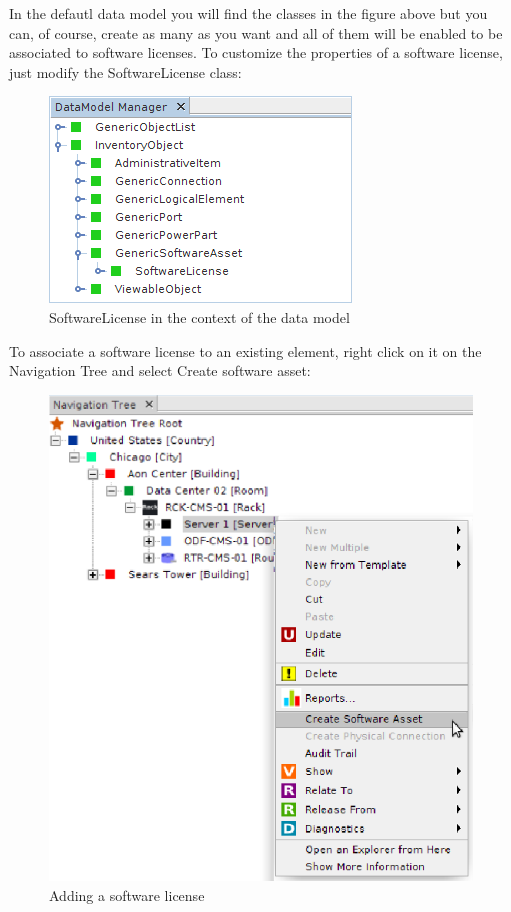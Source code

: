\documentclass[a4paper]{article}
\begin{document}
	    In the defautl data model you will find the classes in the figure above but you can, of course, create as many as you want and all of them will be enabled to be associated to software licenses. To customize the properties of a software license, just modify the SoftwareLicense class:
	    \begin{figure}[h!]
	    	\centering
	    	\includegraphics[width=0.5\linewidth]{img/software_asset_data_model_software_asset.png}
	    	\caption{SoftwareLicense in the context of the data model}
	    	\label{fig:software_asset_data_model_software_asset}
	    \end{figure}
	    
	    To associate a software license to an existing element, right click on it on the Navigation Tree and select Create software asset:
		\begin{figure}[h!]
	     	\centering
	     	\includegraphics[width=0.7\linewidth]{img/software_asset_action.png}
	     	\caption{Adding a software license}
	     	\label{fig:software_asset_action}
		\end{figure}
	    
\end{document}
